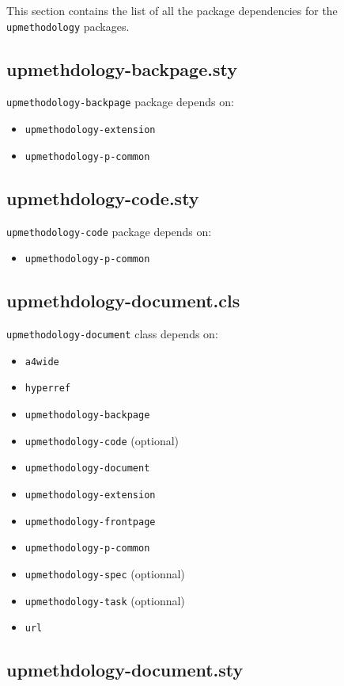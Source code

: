 \documentclass[book,taskpackage,specpackage,codepackage]{upmethodology-document}
\begin{document}
This section contains the list of all the package dependencies for the \texttt{upmethodology} packages.

\subsection{upmethdology-backpage.sty}

\texttt{upmethodology-backpage} package depends on:
\begin{itemize}
\item \texttt{upmethodology-extension}
\item \texttt{upmethodology-p-common}
\end{itemize}

\subsection{upmethdology-code.sty}

\texttt{upmethodology-code} package depends on:
\begin{itemize}
\item \texttt{upmethodology-p-common}
\end{itemize}

\subsection{upmethdology-document.cls}

\texttt{upmethodology-document} class depends on:
\begin{itemize}
\item \texttt{a4wide}
\item \texttt{hyperref}
\item \texttt{upmethodology-backpage}
\item \texttt{upmethodology-code} (optional)
\item \texttt{upmethodology-document}
\item \texttt{upmethodology-extension}
\item \texttt{upmethodology-frontpage}
\item \texttt{upmethodology-p-common}
\item \texttt{upmethodology-spec} (optionnal)
\item \texttt{upmethodology-task} (optionnal)
\item \texttt{url}
\end{itemize}

\subsection{upmethdology-document.sty}
\end{document}
